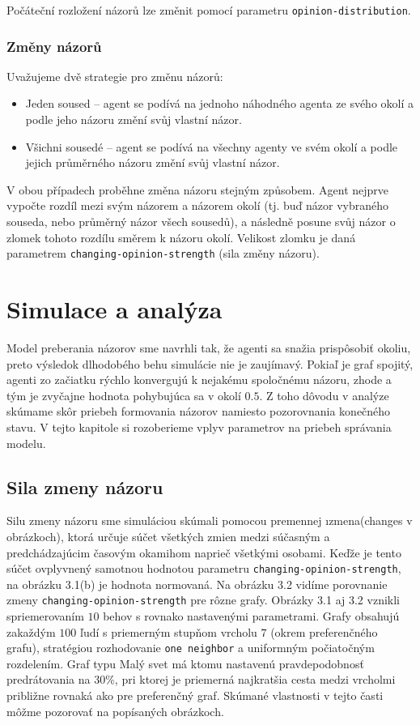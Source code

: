 \documentclass[10pt,a4paper]{report}
\begin{document}
Počáteční rozložení názorů lze změnit pomocí parametru \texttt{opinion-distribution}. 

\subsection{Změny názorů}
Uvažujeme dvě strategie pro změnu názorů:

\begin{itemize}
	\item Jeden soused -- agent se podívá na jednoho náhodného agenta ze svého okolí a podle jeho názoru změní svůj vlastní názor.
	\item Všichni sousedé -- agent se podívá na všechny agenty ve svém okolí a podle jejich průměrného názoru změní svůj vlastní názor.
\end{itemize}

V obou případech proběhne změna názoru stejným způsobem. Agent nejprve vypočte rozdíl mezi svým názorem a názorem okolí (tj. buď názor vybraného souseda, nebo průměrný názor všech sousedů), a následně posune svůj názor o zlomek tohoto rozdílu směrem k názoru okolí. Velikost zlomku je daná parametrem \texttt{changing-opinion-strength} (sila změny názoru).

\chapter{Simulace a analýza}
Model preberania názorov sme navrhli tak, že agenti sa snažia prispôsobiť okoliu, preto výsledok dlhodobého behu simulácie nie je zaujímavý. Pokiaľ je graf spojitý, agenti zo začiatku rýchlo konvergujú k nejakému spoločnému názoru, zhode a tým je zvyčajne hodnota pohybujúca sa v okolí $0.5$. Z toho dôvodu v analýze skúmame skôr priebeh formovania názorov namiesto pozorovnania konečného stavu. V tejto kapitole si rozoberieme vplyv parametrov na priebeh správania modelu.

\section{Sila zmeny názoru}

Silu zmeny názoru sme simuláciou skúmali pomocou premennej \i{zmena}(changes v obrázkoch), ktorá určuje súčet všetkých zmien medzi súčasným a predchádzajúcim časovým okamihom naprieč všetkými osobami. Keďže je tento súčet ovplyvnený samotnou hodnotou parametru \texttt{changing-opinion-strength}, na obrázku 3.1(b) je hodnota normovaná. Na obrázku 3.2 vidíme porovnanie zmeny \texttt{changing-opinion-strength} pre rôzne grafy. Obrázky 3.1 aj 3.2 vznikli spriemerovaním $10$ behov s rovnako nastavenými parametrami. Grafy obsahujú zakaždým $100$ ľudí s priemerným stupňom vrcholu $7$ (okrem preferenčného grafu), stratégiou rozhodovanie \texttt{one neighbor} a uniformným počiatočným rozdelením. Graf typu Malý svet má ktomu nastavenú pravdepodobnosť predrátovania na 30\%, pri ktorej je priemerná najkratšia cesta medzi vrcholmi približne rovnaká ako pre preferenčný graf. Skúmané vlastnosti v tejto časti môžme pozorovať na popísaných obrázkoch.  
\end{document}
